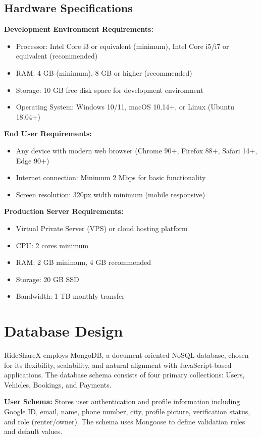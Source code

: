 \documentclass[12pt,a4paper]{report}
\begin{document}
	\subsection{Hardware Specifications}
	
	\textbf{Development Environment Requirements:}
	\begin{itemize}
		\item Processor: Intel Core i3 or equivalent (minimum), Intel Core i5/i7 or equivalent (recommended)
		\item RAM: 4 GB (minimum), 8 GB or higher (recommended)
		\item Storage: 10 GB free disk space for development environment
		\item Operating System: Windows 10/11, macOS 10.14+, or Linux (Ubuntu 18.04+)
	\end{itemize}
	
	\textbf{End User Requirements:}
	\begin{itemize}
		\item Any device with modern web browser (Chrome 90+, Firefox 88+, Safari 14+, Edge 90+)
		\item Internet connection: Minimum 2 Mbps for basic functionality
		\item Screen resolution: 320px width minimum (mobile responsive)
	\end{itemize}
	
	\textbf{Production Server Requirements:}
	\begin{itemize}
		\item Virtual Private Server (VPS) or cloud hosting platform
		\item CPU: 2 cores minimum
		\item RAM: 2 GB minimum, 4 GB recommended
		\item Storage: 20 GB SSD
		\item Bandwidth: 1 TB monthly transfer
	\end{itemize}
	
	\section{Database Design}
	
	RideShareX employs MongoDB, a document-oriented NoSQL database, chosen for its flexibility, scalability, and natural alignment with JavaScript-based applications. The database schema consists of four primary collections: Users, Vehicles, Bookings, and Payments.
	
	\textbf{User Schema:} Stores user authentication and profile information including Google ID, email, name, phone number, city, profile picture, verification status, and role (renter/owner). The schema uses Mongoose to define validation rules and default values.
	
\end{document}

